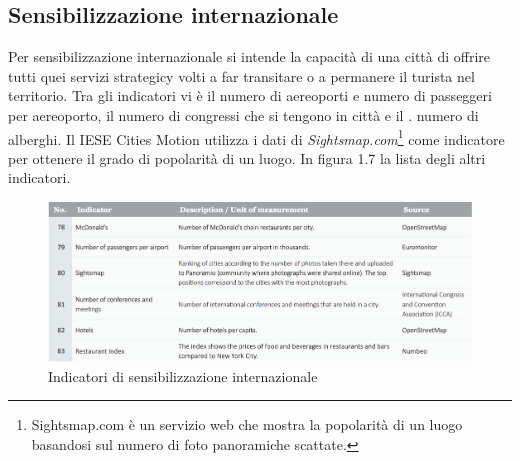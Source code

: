 \subsection{Sensibilizzazione internazionale}
Per sensibilizzazione internazionale si intende la capacità di una città di offrire tutti quei servizi strategicy volti a far transitare o a permanere il turista nel territorio. Tra gli indicatori vi è il numero di aereoporti e numero di passeggeri per aereoporto, il numero di congressi che si tengono in città e il . numero di alberghi. Il IESE Cities Motion utilizza i dati di \textit{Sightsmap.com}\footnote{Sightsmap.com è un servizio web che mostra la popolarità di un luogo basandosi sul numero di foto panoramiche scattate.} come indicatore per ottenere il grado di popolarità di un luogo. In figura 1.7 la lista degli altri indicatori.
\begin{figure}[ht]
	\begin{center}
		\includegraphics[width=320bp]{img/indicatori_sensibilizzaqzione_internazinale.png}
		\caption{Indicatori di sensibilizzazione internazionale}
	\end{center}
\end{figure}


